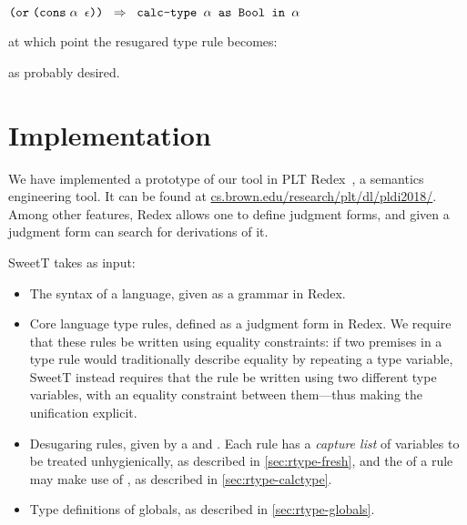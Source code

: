  $\DesugarRule{\nodeTt{or}{\cons{$\PVarA$}{$\epsilon$}}}
               {\texttt{calc-type $\PVarA$ as Bool in $\PVarA$}}$

\noindent
at which point the resugared type rule becomes:
\begin{prooftree}
\end{prooftree}
as probably desired.


\section{Implementation}\label{sec:rtype-implementation}

We have implemented a prototype of our tool in PLT
Redex~\cite{redex}, a semantics engineering tool.
It can be found at \url{cs.brown.edu/research/plt/dl/pldi2018/}.
Among other features, Redex
allows one to define judgment forms, and given a judgment form
can search for derivations of it.

{SweetT} takes as input:
\begin{itemize}
\item The syntax of a language, given as a grammar in Redex.
\item Core language type rules, defined as a judgment form in Redex.
  We require that these rules be written using equality constraints:
  if two premises in a type rule would traditionally describe equality
  by repeating a type variable, SweetT instead requires that the
  rule be written using two different type variables, with an
  equality constraint between them---thus making the
  unification explicit.
\item Desugaring rules, given by a  and . Each
  rule has a \emph{capture list} of variables to be treated
  unhygienically, as described in \cref{sec:rtype-fresh}, and the  of a
  rule may make use of , as described in
  \cref{sec:rtype-calctype}.
\item Type definitions of globals, as described in \cref{sec:rtype-globals}.
\end{itemize}

